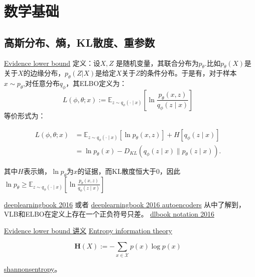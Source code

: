\chapter{数学基础}

\section{高斯分布、熵，KL散度、重参数}

\href{https://en.wikipedia.org/wiki/Evidence_lower_bound}{Evidence lower bound}
定义：设$X, Z$ 是随机变量，其联合分布为$p_{\theta}$.比如$p_{\theta}(X)$是关于$X$的边缘分布，$p_{\theta}(Z|X)$是给定$X$关于$Z$的条件分布。于是有，对于样本$x \sim p_{\theta}$,对任意分布$q_{\phi}$，其ELBO定义为：
\begin{equation}
L(\phi, \theta ; x):=\mathbb{E}_{z \sim q_\phi(\cdot \mid x)}\left[\ln \frac{p_\theta(x, z)}{q_\phi(z \mid x)}\right]
\end{equation}
等价形式为：

\begin{equation}
\begin{aligned}
L(\phi, \theta ; x) &
=\mathbb{E}_{z \sim q_\phi(\cdot \mid x)}\left[\ln p_\theta(x, z)
\right]+H\left[q_\phi(z \mid x)\right] \\ &
=\ln p_\theta(x)-D_{K L}\left(q_\phi(z \mid x) \| p_\theta(z \mid x)\right) .
\end{aligned}
\end{equation}

其中$H$表示熵，$\ln p_{\theta}$为$x$的证据，而KL散度恒大于0，因此
$\ln p_{\theta} \geq \mathbb{E}_{z \sim q_\phi(\cdot \mid x)}
\left[\ln \frac{p_\theta(x, z)}{q_\phi(z \mid x)}\right]
$

\href{https://github.com/janishar/mit-deep-learning-book-pdf}{deeplearningbook 2016} 或者
\href{https://www.deeplearningbook.org/contents/autoencoders.html}{deeplearningbook 2016 autoencoders}
从中了解到，VLB和ELBO在定义上存在一个正负符号只差。
\href{https://github.com/goodfeli/dlbook_notation}{dlbook notation 2016}

\href{https://www.inf.ed.ac.uk/teaching/courses/fmcs1/slides/lecture25.pdf}{Evidence lower bound 讲义}
\href{https://en.wikipedia.org/wiki/Entropy\_(information\_theory)}{Entropy information theory }

\begin{equation}
\mathbf{H}(X):=-\sum_{x \in \mathcal{X}} p(x) \log p(x)
\end{equation}

\href{https://planetmath.org/shannonsentropy}{shannonsentropy}。

